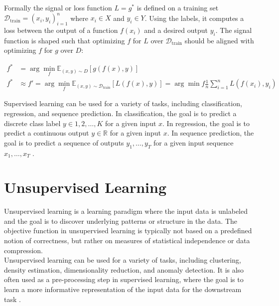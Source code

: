 Formally the signal or loss function $L = g^*$ is defined on a training set $\mathcal{D}_{\text{train}} = {(x_i,y_i)}_{i=1}^n$ where $x_i \in X$ and $y_i \in Y$. Using the 
labels, it computes a loss between the output of a function $f(x_i)$ and a desired output $y_i$. The signal function is shaped such that optimizing $f$ for $L$ 
over $\mathcal{D}_{\text{train}}$ should be aligned with optimizing $f$ for $g$ over $D$:

\begin{equation}
\begin{aligned}
f^* &= \arg\min_{f} \mathbb{E}_{(x,y) \sim D}[g(f(x), y)] \\
f^* &\approx f' = \arg\min_{f} \mathbb{E}_{(x,y) \sim \mathcal{D}_{\text{train}}}[L(f(x),y)] = \arg\min{f} \frac{1}{n}\sum_{i=1}^n L(f(x_i),y_i)
\end{aligned}
\end{equation}


Supervised learning can be used for a variety of tasks, including classification, regression, and sequence prediction. In classification, 
the goal is to predict a discrete class label $y \in {1,2,\ldots,K}$ for a given input $x$. In regression, the goal is to predict a continuous 
output $y \in \mathbb{R}$ for a given input $x$. In sequence prediction, the goal is to predict a sequence of outputs $y_1,\ldots,y_T$ for a 
given input sequence $x_1,\ldots,x_T$ \cite[chapter~4]{bishop} \cite[chapter~5, chapter~6]{Goodfellow}.

\section{Unsupervised Learning}
\label{section:unsup_learn}
Unsupervised learning is a learning paradigm where the input data is unlabeled and the goal is to discover underlying patterns or structure in the data.
The objective function in unsupervised learning is typically not based on a predefined notion of correctness, but rather on measures of statistical
independence or data compression.\\

Unsupervised learning can be used for a variety of tasks, including clustering, density estimation, dimensionality reduction, and anomaly detection.
It is also often used as a pre-processing step in supervised learning, where the goal is to learn a more informative representation of the input data 
for the downstream task \cite[chapter~9]{bishop} \cite[chapter~5]{Goodfellow}. 

